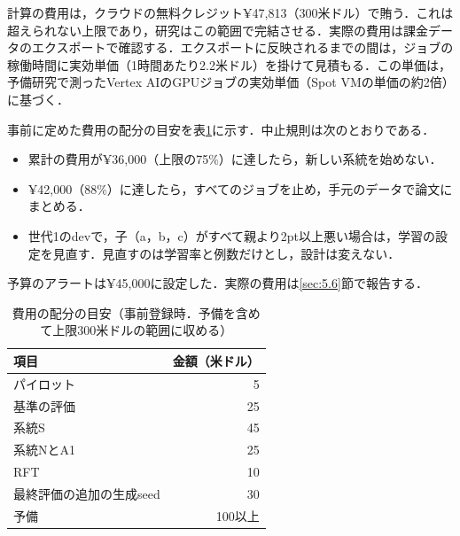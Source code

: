 計算の費用は，クラウドの無料クレジット¥47,813（300米ドル）で賄う．これは超えられない上限であり，研究はこの範囲で完結させる．実際の費用は課金データのエクスポートで確認する．エクスポートに反映されるまでの間は，ジョブの稼働時間に実効単価（1時間あたり2.2米ドル）を掛けて見積もる．この単価は，予備研究で測ったVertex AIのGPUジョブの実効単価（Spot VMの単価の約2倍）に基づく．

事前に定めた費用の配分の目安を表\ref{tab:4.7}に示す．中止規則は次のとおりである．
\begin{itemize}
\item 累計の費用が¥36,000（上限の75\%）に達したら，新しい系統を始めない．
\item ¥42,000（88\%）に達したら，すべてのジョブを止め，手元のデータで論文にまとめる．
\item 世代1のdevで，子（a，b，c）がすべて親より2pt以上悪い場合は，学習の設定を見直す．見直すのは学習率と例数だけとし，設計は変えない．
\end{itemize}
予算のアラートは¥45,000に設定した．実際の費用は\ref{sec:5.6}節で報告する．

\begin{table}[htbp]
\caption{費用の配分の目安（事前登録時．予備を含めて上限300米ドルの範囲に収める）}
\label{tab:4.7}
\centering
\small
\begin{tabular}{|l|r|}
\hline
項目 & 金額（米ドル） \\
\hline
パイロット & 5 \\
基準の評価 & 25 \\
系統S & 45 \\
系統NとA1 & 25 \\
RFT & 10 \\
最終評価の追加の生成seed & 30 \\
予備 & 100以上 \\
\hline
\end{tabular}
\end{table}
